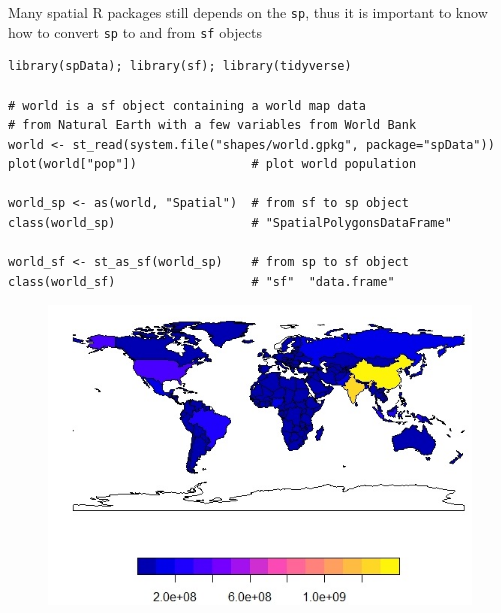 \documentclass[12pt]{beamer}
\begin{document}
\begin{frame}[fragile]

Many spatial R packages still depends on the \texttt{sp}, thus it is important to know how to convert \texttt{sp} to and from \texttt{sf} objects

{\scriptsize
\begin{verbatim}
library(spData); library(sf); library(tidyverse)

# world is a sf object containing a world map data
# from Natural Earth with a few variables from World Bank
world <- st_read(system.file("shapes/world.gpkg", package="spData"))
plot(world["pop"])                # plot world population

world_sp <- as(world, "Spatial")  # from sf to sp object
class(world_sp)                   # "SpatialPolygonsDataFrame"

world_sf <- st_as_sf(world_sp)    # from sp to sf object
class(world_sf)                   # "sf"  "data.frame"

\end{verbatim}
}
\vspace{-15pt}
\begin{figure}
\includegraphics[scale=0.35]{World_pop.jpeg}
\end{figure}
\end{frame}
\end{document}
